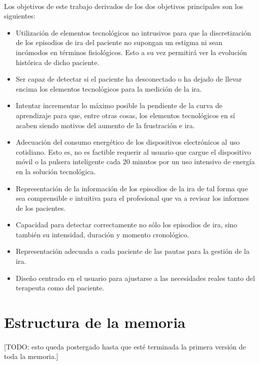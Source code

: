 \paragraph{}
Los objetivos de este trabajo derivados de los dos objetivos principales son los siguientes:
\begin{itemize}
    \item Utilización de elementos tecnológicos no intrusivos para que la discretización de los episodios de ira del paciente no supongan un estigma ni sean incómodos en términos fisiológicos. Esto a su vez permitirá ver la evolución histórica de dicho paciente.
    \item Ser capaz de detectar si el paciente ha desconectado o ha dejado de llevar encima los elementos tecnológicos para la medición de la ira.
    \item Intentar incrementar lo máximo posible la pendiente de la curva de aprendizaje para que, entre otras cosas, los elementos tecnológicos en sí acaben siendo motivos del aumento de la frustración e ira.
    \item Adecuación del consumo energético de los dispositivos electrónicos al uso cotidiano. Esto es, no es factible requerir al usuario que cargue el dispositivo móvil o la pulsera inteligente cada 20 minutos por un uso intensivo de energía en la solución tecnológica.
    \item Representación de la información de los episodios de la ira de tal forma que sea comprensible e intuitiva para el profesional que va a revisar los informes de los pacientes.
    \item Capacidad para detectar correctamente no sólo los episodios de ira, sino también su intensidad, duración y momento cronológico.
    \item Representación adecuada a cada paciente de las pautas para la gestión de la ira.
    \item Diseño centrado en el usuario para ajustarse a las necesidades reales tanto del terapeuta como del paciente.
\end{itemize}

\section{Estructura de la memoria}
\paragraph{}
[TODO: esto queda postergado hasta que esté terminada la primera versión de toda la memoria.]